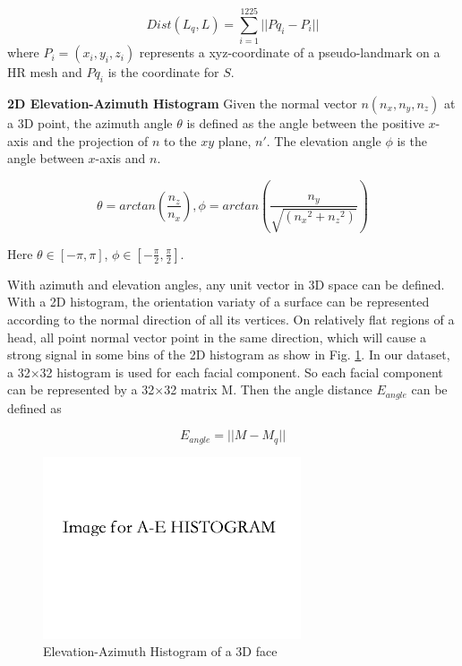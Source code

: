 \documentclass[annual]{acmsiggraph}
\begin{document}
\begin{equation}
Dist(L_q,L)=\sum_{i=1}^{1225}||Pq_i-P_i||
\end{equation}
where $P_{i}=(x_i,y_i,z_i)$ represents a xyz-coordinate of a pseudo-landmark on a HR mesh and $Pq_{i}$ is the coordinate for $S$.

\textbf{2D Elevation-Azimuth Histogram} Given the normal vector $n(n_x,n_y,n_z)$ at a 3D point, the azimuth angle $\theta$ is defined as the angle between the positive $x$-axis and the projection of $n$ to the $xy$ plane, $n'$. The elevation angle $\phi$ is the angle between $x$-axis and $n$.

\begin{equation}
\theta=arctan(\frac{n_z}{n_x}) ,         \phi=arctan(\frac{n_y}{\sqrt{({n_x}^2+{n_z}^2)}})
\end{equation}

Here $\theta{\in}[-\pi,\pi]$, $\phi{\in}[-\frac{\pi}{2},\frac{\pi}{2}]$.

With azimuth and elevation angles, any unit vector in 3D space can be defined. With a 2D histogram, the orientation variaty of a surface can be represented according to the normal direction of all its vertices. On relatively flat regions of a head, all point normal vector point in the same direction, which will cause a strong signal in some bins of the 2D histogram as show in Fig. \ref{AEhist}. In our dataset, a 32$\times$32 histogram is used for each facial component. So each facial component can be represented by a 32$\times$32 matrix M. Then the angle distance $E_{angle}$ can be defined as 

\begin{equation}
E_{angle}=||M-M_q||
\end{equation}

\begin{figure}[ht]
  \centering
  \includegraphics[width=3in]{images/AEhist}
  \caption{Elevation-Azimuth Histogram of a 3D face}\label{AEhist}
\end{figure}
\end{document}
